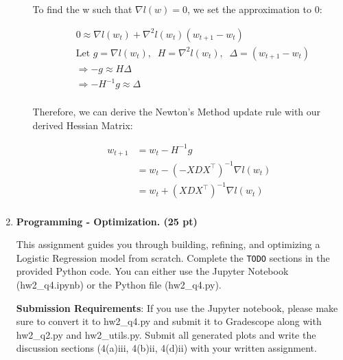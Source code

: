\documentclass{article}
\theoremstyle{definition}
\theoremstyle{remark}
\newenvironment{Q}
        {%
          \clearpage
          \item
        }
        {%
          \phantom{s} %
          \bigskip
        }
\begin{document}
\begin{enumerate}[font={\Large\bfseries},left=0pt]
\begin{tcolorbox}
\begin{enumerate}
			      To find the w such that $\nabla l(w) = 0$, we set the approximation to 0:

			      \begin{align}
				       & 0 \approx \nabla l(w_{t}) + \nabla^2 l(w_t)(w_{t+1} - w_t)                              \\
				       & \text{Let } g = \nabla l(w_t), \;\; H = \nabla^2 l(w_t),\;\; \Delta = (w_{t + 1} - w_t) \\
				       & \Rightarrow -g \approx H\Delta                                                          \\
				       & \Rightarrow -H^{-1}g \approx \Delta                                                     \\
			      \end{align}

			      Therefore, we can derive the Newton's Method update rule with our derived Hessian Matrix:

			      \begin{align}
				      w_{t + 1} & = w_t-H^{-1}g                                 \\
				                & = w_{t} - (-XDX^\intercal)^{-1} \nabla l(w_t) \\
				                & = w_{t} + (XDX^\intercal)^{-1} \nabla l(w_t)  \\
			      \end{align}



		\end{enumerate}
	\end{tcolorbox}
	\begin{Q}
		\textbf{\Large Programming - Optimization. (25 pt)}

		This assignment guides you through building, refining, and optimizing a Logistic Regression model from scratch. Complete the \texttt{TODO} sections in the provided Python code. You can either use the Jupyter Notebook (hw2\_q4.ipynb) or the Python file (hw2\_q4.py).

		\textbf{Submission Requirements}: If you use the Jupyter notebook, please make sure to convert it to hw2\_q4.py and submit it to Gradescope along with hw2\_q2.py and hw2\_utils.py. Submit all generated plots and write the discussion sections (4(a)iii, 4(b)ii, 4(d)ii) with your written assignment.


\end{Q}
\end{enumerate}
\end{document}
